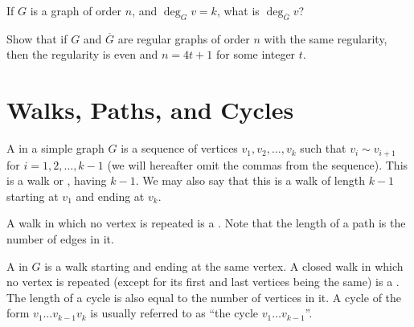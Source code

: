 \begin{Exercise}
If $G$ is a graph of order $n$, and $\deg_G v = k$, what is $\deg_{\overline G} v$?
\end{Exercise}

\begin{Exercise}
Show that if $G$ and $\overline G$ are regular graphs of order $n$ with the same regularity, then the regularity is even and $n = 4t + 1$ for some integer $t$.
\end{Exercise}


\section{Walks, Paths, and Cycles}\label{sec:Walks}

A  in a simple graph $G$ is a sequence of vertices $v_1, v_2, \ldots, v_k$ such that $v_i \sim v_{i + 1}$ for $i = 1, 2, \ldots, k - 1$ (we will hereafter omit the commas from the sequence). This is a walk  or , having  $k - 1$. We may also say that this is a walk of length $k - 1$ starting at $v_1$ and ending at $v_k$.

A walk in which no vertex is repeated is a . Note that the length of a path is the number of edges in it.

A  in $G$ is a walk starting and ending at the same vertex. A closed walk in which no vertex is repeated (except for its first and last vertices being the same) is a . The length of a cycle is also equal to the number of vertices in it. A cycle of the form $v_1 \ldots v_{k-1} v_k$ is usually referred to as ``the cycle $v_1 \ldots v_{k-1}$''.

